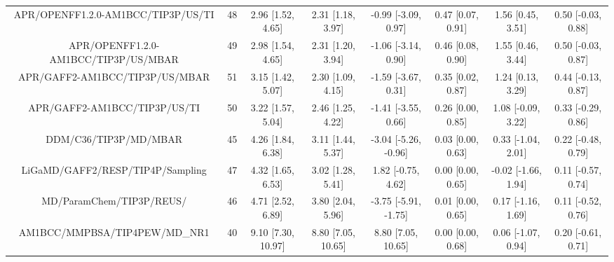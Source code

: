 \documentclass[8pt]{article}
\begin{document}
\begin{center}
\begin{footnotesize}
\begin{longtable}{|cccccccc|}
   APR/OPENFF1.2.0-AM1BCC/TIP3P/US/TI &  48 &   2.96 [1.52, 4.65] &   2.31 [1.18, 3.97] &   -0.99 [-3.09, 0.97] &  0.47 [0.07, 0.91] &    1.56 [0.45, 3.51] &   0.50 [-0.03, 0.88] \\
 APR/OPENFF1.2.0-AM1BCC/TIP3P/US/MBAR &  49 &   2.98 [1.54, 4.65] &   2.31 [1.20, 3.94] &   -1.06 [-3.14, 0.90] &  0.46 [0.08, 0.90] &    1.55 [0.46, 3.44] &   0.50 [-0.03, 0.87] \\
       APR/GAFF2-AM1BCC/TIP3P/US/MBAR &  51 &   3.15 [1.42, 5.07] &   2.30 [1.09, 4.15] &   -1.59 [-3.67, 0.31] &  0.35 [0.02, 0.87] &    1.24 [0.13, 3.29] &   0.44 [-0.13, 0.87] \\
         APR/GAFF2-AM1BCC/TIP3P/US/TI &  50 &   3.22 [1.57, 5.04] &   2.46 [1.25, 4.22] &   -1.41 [-3.55, 0.66] &  0.26 [0.00, 0.85] &   1.08 [-0.09, 3.22] &   0.33 [-0.29, 0.86] \\
                DDM/C36/TIP3P/MD/MBAR &  45 &   4.26 [1.84, 6.38] &   3.11 [1.44, 5.37] &  -3.04 [-5.26, -0.96] &  0.03 [0.00, 0.63] &   0.33 [-1.04, 2.01] &   0.22 [-0.48, 0.79] \\
     LiGaMD/GAFF2/RESP/TIP4P/Sampling &  47 &   4.32 [1.65, 6.53] &   3.02 [1.28, 5.41] &    1.82 [-0.75, 4.62] &  0.00 [0.00, 0.65] &  -0.02 [-1.66, 1.94] &   0.11 [-0.57, 0.74] \\
             MD/ParamChem/TIP3P/REUS/ &  46 &   4.71 [2.52, 6.89] &   3.80 [2.04, 5.96] &  -3.75 [-5.91, -1.75] &  0.01 [0.00, 0.65] &   0.17 [-1.16, 1.69] &   0.11 [-0.52, 0.76] \\
        AM1BCC/MMPBSA/TIP4PEW/MD\_NR1 &  40 &  9.10 [7.30, 10.97] &  8.80 [7.05, 10.65] &    8.80 [7.05, 10.65] &  0.00 [0.00, 0.68] &   0.06 [-1.07, 0.94] &   0.20 [-0.61, 0.71] \\
\end{longtable}
\end{footnotesize}
\end{center}
\end{document}
